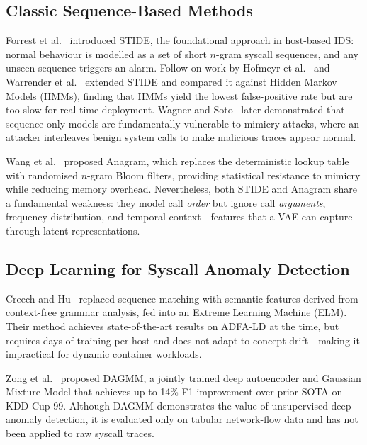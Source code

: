 \subsection{Classic Sequence-Based Methods}
\label{subsec:classic}

Forrest et al.~\cite{forrest1996sense} introduced STIDE, the foundational approach in
host-based IDS: normal behaviour is modelled as a set of short $n$-gram syscall sequences,
and any unseen sequence triggers an alarm.
Follow-on work by Hofmeyr et al.~\cite{hofmeyr1998ids} and Warrender et
al.~\cite{warrender1999detecting} extended STIDE and compared it against Hidden Markov
Models (HMMs), finding that HMMs yield the lowest false-positive rate but are too slow for
real-time deployment. Wagner and Soto~\cite{wagner2002mimicry} later demonstrated that
sequence-only models are fundamentally vulnerable to mimicry attacks, where an attacker
interleaves benign system calls to make malicious traces appear normal.

Wang et al.~\cite{wang2006anagram} proposed Anagram, which replaces the deterministic lookup
table with randomised $n$-gram Bloom filters, providing statistical resistance to mimicry
while reducing memory overhead. Nevertheless, both STIDE and Anagram share a fundamental
weakness: they model call \textit{order} but ignore call \textit{arguments}, frequency
distribution, and temporal context---features that a VAE can capture through latent
representations.

\subsection{Deep Learning for Syscall Anomaly Detection}
\label{subsec:deep}

Creech and Hu~\cite{creech2014semantic} replaced sequence matching with semantic features
derived from context-free grammar analysis, fed into an Extreme Learning Machine (ELM).
Their method achieves state-of-the-art results on ADFA-LD at the time, but requires
days of training per host and does not adapt to concept drift---making it impractical
for dynamic container workloads.

Zong et al.~\cite{zong2018dagmm} proposed DAGMM, a jointly trained deep autoencoder and
Gaussian Mixture Model that achieves up to 14\% F1 improvement over prior SOTA on KDD Cup
99. Although DAGMM demonstrates the value of unsupervised deep anomaly detection, it is
evaluated only on tabular network-flow data and has not been applied to raw syscall traces.

